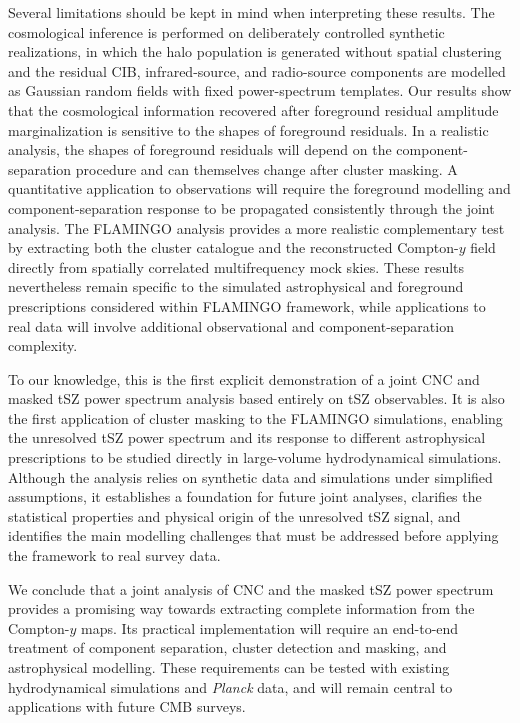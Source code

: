 \documentclass[aps,prd,twocolumn,superscriptaddress,nofootinbib,floatfix]{revtex4-2}
\begin{document}
Several limitations should be kept in mind when interpreting these results. The cosmological inference is performed on deliberately controlled synthetic realizations, in which the halo population is generated without spatial clustering and the residual CIB, infrared-source, and radio-source components are modelled as Gaussian random fields with fixed power-spectrum templates. Our results show that the cosmological information recovered after foreground residual amplitude marginalization is sensitive to the shapes of foreground residuals. In a realistic analysis, the shapes of foreground residuals will depend on the component-separation procedure and can themselves change after cluster masking. A quantitative application to observations will require the foreground modelling and component-separation response to be propagated consistently through the joint analysis. The FLAMINGO analysis provides a more realistic complementary test by extracting both the cluster catalogue and the reconstructed Compton-$y$ field directly from spatially correlated multifrequency mock skies. These results nevertheless remain specific to the simulated astrophysical and foreground prescriptions considered within FLAMINGO framework, while applications to real data will involve additional observational and component-separation complexity.

To our knowledge, this is the first explicit demonstration of a joint CNC and masked tSZ power spectrum analysis based entirely on tSZ observables. It is also the first application of cluster masking to the FLAMINGO simulations, enabling the unresolved tSZ power spectrum and its response to different astrophysical prescriptions to be studied directly in large-volume hydrodynamical simulations. Although the analysis relies on synthetic data and simulations under simplified assumptions, it establishes a foundation for future joint analyses, clarifies the statistical properties and physical origin of the unresolved tSZ signal, and identifies the main modelling challenges that must be addressed before applying the framework to real survey data.

We conclude that a joint analysis of CNC and the masked tSZ power spectrum provides a promising way towards extracting complete information from the Compton-$y$ maps. Its practical implementation will require an end-to-end treatment of component separation, cluster detection and masking, and astrophysical modelling. These requirements can be tested with existing hydrodynamical simulations and \textit{Planck} data, and will remain central to applications with future CMB surveys.
\end{document}
